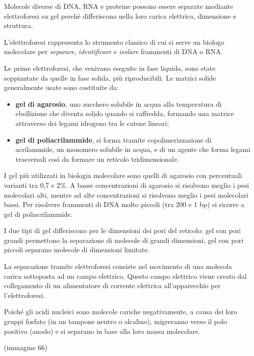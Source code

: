 \documentclass[]{article}
\begin{document}
Molecole diverse di DNA, RNA e proteine possono essere separate modiante
elettroforesi su gel perchè differiscono nella loro carica elettrica,
dimensione e struttura.

L'elettroforesi rappresenta lo strumento classico di cui si serve un
biologo molecolare per \emph{separare}, \emph{identificare} e
\emph{isolare} frammenti di DNA o RNA.

Le prime elettroforesi, che venivano eseguite in fase liquida, sono
state soppiantate da quelle in fase solida, più riproducibili. Le
matrici solide generalmente usate sono costituite da:

\begin{itemize}
\itemsep1pt\parskip0pt
\item
  \textbf{gel di agarosio}, uno zucchero solubile in acqua alla
  temperatura di ebollizione che diventa solido quando si raffredda,
  formando una matrice attraverso dei legami idrogeno tra le catene
  lineari;
\item
  \textbf{gel di poliacrilammide}, si forma tramite copolimerizzazione
  di acrilammide, un monomero solubile in acqua, e di un agente che
  forma legami trasversali così da formare un reticolo tridimensionale.
\end{itemize}

I gel più utilizzati in biologia molecolare sono quelli di agarosio con
percentuali varianti tra 0,7 e 2\%. A basse concentrazioni di agarosio
si risolvono meglio i pesi molecolari alti, mentre ad alte
concentrazioni si risolvono meglio i pesi molecolari bassi. Per
risolvere frammenti di DNA molto piccoli (tra 200 e 1 bp) si ricorre a
gel di poliacrilammide.

I due tipi di gel differiscono per le dimensioni dei pori del reticolo:
gel con pori grandi permettono la separazione di molecole di grandi
dimensioni, gel con pori piccoli separano molecole di dimensioni
limitate.

La separazione tramite elettroforesi consiste nel movimento di una
molecola carica sottoposta ad un campo elettrico. Questo campo elettrico
viene creato dal collegamento di un alimentatore di corrente elettrica
all'apparecchio per l'elettroforesi.

Poiché gli acidi nucleici sono molecole cariche negativamente, a causa
dei loro gruppi fosfato (in un tampone neutro o alcalino), migreranno
verso il polo positivo (anodo) e si separano in base alla loro massa
molecolare.

(immagine 66)
\end{document}
